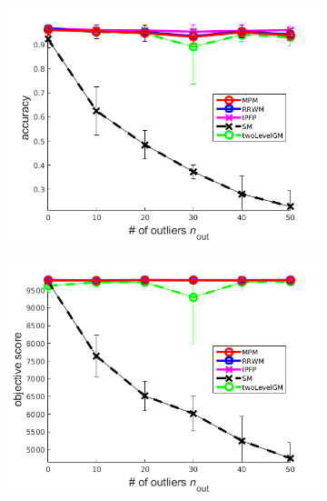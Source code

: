 \begin{figure}[h] 
		\begin{subfigure}[b]{0.3\textwidth}
			\centering
			\includegraphics[scale=0.25]{"chapter3/fig/SyntheticTest/no_descr/Results_v4.3.3/Test1/accuracy_avg10t"} 
		\end{subfigure}%
		\begin{subfigure}[b]{0.3\textwidth}
			\centering
			\includegraphics[scale=0.25]{"chapter3/fig/SyntheticTest/no_descr/Results_v4.3.3/Test1/score_avg10t"} 
		\end{subfigure} 
		\begin{subfigure}[b]{0.3\textwidth}
			\centering

\end{subfigure}
\end{figure}
